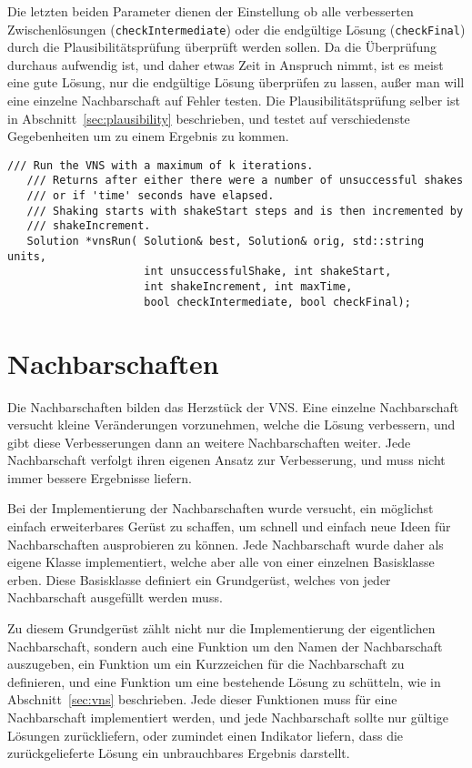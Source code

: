 Die letzten beiden Parameter dienen der Einstellung ob alle verbesserten Zwischenlösungen (\texttt{checkIntermediate}) oder die endgültige Lösung (\texttt{checkFinal}) durch die Plausibilitätsprüfung überprüft werden sollen.
Da die Überprüfung durchaus aufwendig ist, und daher etwas Zeit in Anspruch nimmt, ist es meist eine gute Lösung, nur die endgültige Lösung überprüfen zu lassen, außer man will eine einzelne Nachbarschaft
auf Fehler testen. Die Plausibilitätsprüfung selber ist in Abschnitt~\ref{sec:plausibility} beschrieben, und testet auf verschiedenste Gegebenheiten um zu einem Ergebnis zu kommen.

\singlespacing
\begin{lstlisting}[caption={Signatur der Funktion, welche die Variable Nachbarschaftssuche ausführt und steuert},label={lst:vns}]
   /// Run the VNS with a maximum of k iterations.
   /// Returns after either there were a number of unsuccessful shakes 
   /// or if 'time' seconds have elapsed.
   /// Shaking starts with shakeStart steps and is then incremented by
   /// shakeIncrement.
   Solution *vnsRun( Solution& best, Solution& orig, std::string units, 
                     int unsuccessfulShake, int shakeStart, 
                     int shakeIncrement, int maxTime, 
                     bool checkIntermediate, bool checkFinal);
\end{lstlisting}

\section{Nachbarschaften}
Die Nachbarschaften bilden das Herzstück der VNS\@. Eine einzelne Nachbarschaft versucht kleine Veränderungen vorzunehmen, welche die Lösung verbessern, und gibt diese Verbesserungen dann an weitere Nachbarschaften weiter.
Jede Nachbarschaft verfolgt ihren eigenen Ansatz zur Verbesserung, und muss nicht immer bessere Ergebnisse liefern. 

Bei der Implementierung der Nachbarschaften wurde versucht, ein möglichst einfach erweiterbares Gerüst zu schaffen, um schnell und einfach neue Ideen für Nachbarschaften ausprobieren zu können. Jede Nachbarschaft
wurde daher als eigene Klasse implementiert, welche aber alle von einer einzelnen Basisklasse erben. Diese Basisklasse definiert ein Grundgerüst, welches von jeder Nachbarschaft ausgefüllt werden muss. 

Zu diesem Grundgerüst zählt nicht nur die Implementierung der eigentlichen Nachbarschaft, sondern auch eine Funktion um den Namen der Nachbarschaft auszugeben, ein Funktion um ein Kurzzeichen für die Nachbarschaft
zu definieren, und eine Funktion um eine bestehende Lösung zu schütteln, wie in Abschnitt~\ref{sec:vns} beschrieben. Jede dieser Funktionen muss für eine Nachbarschaft implementiert werden, und jede Nachbarschaft
sollte nur gültige Lösungen zurückliefern, oder zumindet einen Indikator liefern, dass die zurückgelieferte Lösung ein unbrauchbares Ergebnis darstellt.


